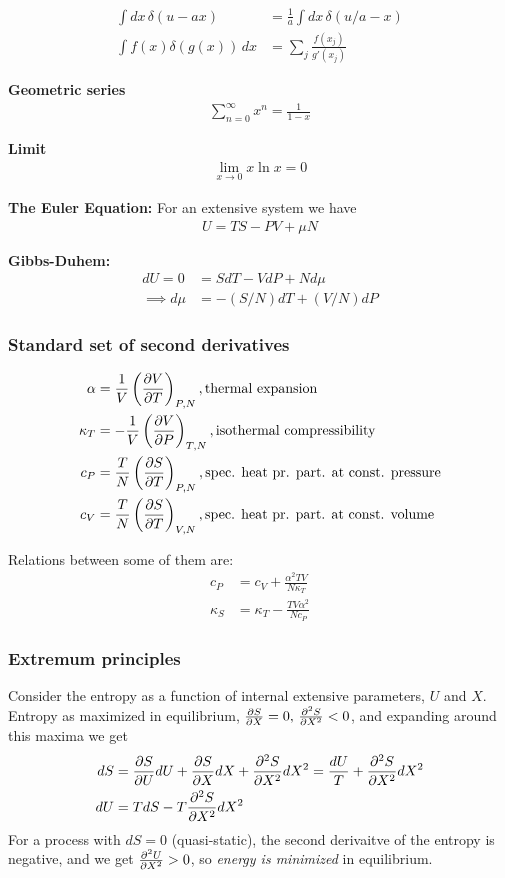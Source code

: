 \documentclass[a4paper, english, 12pt]{article}
\begin{document}
\begin{multicols*}{2}
\begin{align*}
    \int dx\,\delta(u-ax) &= \frac{1}{a}\int dx\,\delta(u/a - x) \\ 
    \int f(x)\delta(g(x))\,dx &= \sum_j \frac{f(x_j)}{g'(x_j)}
\end{align*}

\textbf{Geometric series}
\begin{align*}
    \sum_{n=0}^\infty x^n = \frac{1}{1-x}
\end{align*}

\textbf{Limit}
\begin{align*}
    \lim_{x\to0} x\ln x = 0
\end{align*}

\textbf{The Euler Equation:}
For an extensive system we have 
\begin{align*}
    U=TS-PV+\mu N
\end{align*}

\textbf{Gibbs-Duhem:}
\begin{align*}
    dU=0 &= SdT-VdP+Nd\mu \\ 
    \implies d\mu &= -(S/N)dT+(V/N)dP  
\end{align*}


\subsubsection*{\scriptsize Standard set of second derivatives}
\begin{align*}
    \alpha &= \frac{1}{V}\left(\pdv{V}{T} \right)_{P,N}, \text{thermal expansion} \\ 
    \kappa_T &= -\frac{1}{V}\left(\pdv{V}{P} \right)_{T,N}, \text{isothermal compressibility} \\ 
    c_P &= \frac{T}{N}\left(\pdv{S}{T} \right)_{P,N}, \text{spec. heat pr. part. at const. pressure} \\ 
    c_V &= \frac{T}{N}\left(\pdv{S}{T} \right)_{V,N}, \text{spec. heat pr. part. at const. volume}
\end{align*}

Relations between some of them are:
\begin{align*}
    c_P &= c_V + \frac{\alpha^2 TV}{N\kappa_T} \\ 
    \kappa_S &= \kappa_T - \frac{TV \alpha^2}{Nc_P}
\end{align*}


\subsubsection*{\scriptsize Extremum principles}
Consider the entropy as a function of internal extensive parameters, $U$ and $X$. Entropy as maximized in equilibrium, $\pdv{S}{X}=0,\,\pdv[2]{S}{X}<0$, and expanding around this maxima we get 
\begin{align*}
    dS &= \pdv{S}{U} dU + \pdv{S}{X}dX + \pdv[2]{S}{X}dX^2 = \frac{dU}{T} + \pdv[2]{S}{X}dX^2 \\ 
    dU &= TdS - T \pdv[2]{S}{X}dX^2 
\end{align*}
For a process with $dS=0$ (quasi-static), the second derivaitve of the entropy is negative, and we get $\pdv[2]{U}{X}>0$, so \textit{energy is minimized} in equilibrium.  


\end{multicols*}
\end{document}
